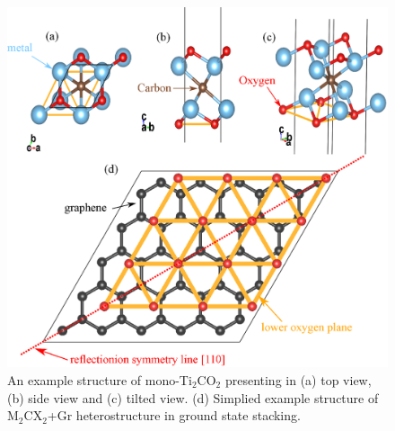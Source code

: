 \begin{figure}[htb]
\centering
\includegraphics[width=0.8\linewidth]{stacking.eps}%
\caption{An example structure of mono-Ti$_2$CO$_2$ presenting in (a) top view, (b) side view and (c) tilted view. (d)  Simplied example structure of M$_2$CX$_2$+Gr heterostructure in ground state stacking. \label{Li_stacking}}
\end{figure}

